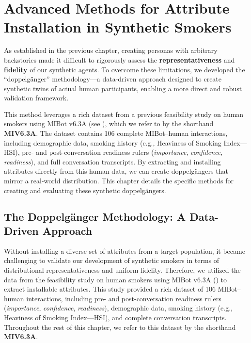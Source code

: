 \chapter{Advanced Methods for Attribute Installation in Synthetic Smokers}
\label{ch:synthetic-doppelganger}

As established in the previous chapter, creating personas with arbitrary backstories
made it difficult to rigorously assess the \textbf{representativeness} and
\textbf{fidelity} of our synthetic agents. To overcome these limitations, we developed
the ``doppelgänger'' methodology---a data-driven approach designed to create synthetic
twins of actual human participants, enabling a more direct and robust validation
framework.

This method leverages a rich dataset from a previous feasibility study on human smokers
using MIBot v6.3A (see ), which we refer to by the shorthand
\textbf{MIV6.3A}. The dataset contains 106 complete MIBot--human interactions,
including demographic data, smoking history (e.g., Heaviness of Smoking Index---HSI),
pre- and post-conversation readiness rulers (\emph{importance}, \emph{confidence},
\emph{readiness}), and full conversation transcripts. By extracting and installing
attributes directly from this human data, we can create doppelgängers that mirror a
real-world distribution. This chapter details the specific methods for creating and
evaluating these synthetic doppelgängers.

\section{The Doppelgänger Methodology: A Data-Driven Approach}
\label{sec:synthetic-smoker-doppelgänger}

Without installing a diverse set of attributes from a target population, it became
challenging to validate our development of synthetic smokers in terms of distributional
representativeness and uniform fidelity. Therefore, we utilized the data from the
feasibility study on human smokers using MIBot v6.3A () to extract
installable attributes. This study provided a rich dataset of 106 MIBot--human
interactions, including pre- and post-conversation readiness rulers (\emph{importance},
\emph{confidence}, \emph{readiness}), demographic data, smoking history (e.g.,
Heaviness of Smoking Index---HSI), and complete conversation transcripts. Throughout
the rest of this chapter, we refer to this dataset by the shorthand \textbf{MIV6.3A}.

